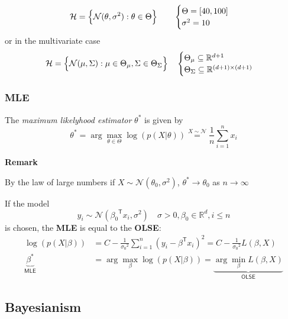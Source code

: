 \newpar{}
\noindent\begin{equation*}
    \mathcal{H}=\Bigl\{\mathcal{N}(\theta, \sigma^2): \theta\in\Theta\Bigr\}\qquad \begin{cases}
        \Theta = [40,100] \\
        \sigma^2 = 10
    \end{cases}
\end{equation*}
or in the multivariate case
\noindent\begin{equation*}
    \mathcal{H}=\Bigl\{\mathcal{N}(\mu, \Sigma): \mu\in\Theta_\mu, \Sigma\in\Theta_\Sigma\Bigr\}\quad \begin{cases}
        \Theta_\mu\subseteq \mathbb{R}^{d+1} \\
        \Theta_\Sigma\subseteq \mathbb{R}^{(d+1)\times (d+1)}
    \end{cases}
\end{equation*}

\subsubsection{MLE}
The \textit{maximum likelyhood estimator} $\theta^*$ is given by
\noindent\begin{equation*}
    \theta^* = \arg\max_{\theta\in\Theta} \log(p(X|\theta)) \overset{X\sim\mathcal{N}}{=} \frac{1}{n} \sum_{i=1}^{n} x_i
\end{equation*}

\textbf{Remark}

By the law of large numbers if $X\sim \mathcal{N}(\theta_0, \sigma^2)$, $\theta^*\to\theta_0$ as $n\to\infty$

\newpar{}

If the model
\noindent\begin{equation*}
    y_i\sim \mathcal{N}({\beta_0}^{\mathsf{T}}x_i, \sigma^2)\quad \sigma>0, \beta_0\in \mathbb{R}^d, i\leq n
\end{equation*}
is chosen, the \textbf{MLE} is equal to the \textbf{OLSE}:
\noindent\begin{align*}
    \log(p(X|\beta))&= C -\frac{1}{{\sigma_0}^2}\sum_{i=1}^{n} {(y_i-\beta^{\mathsf{T}}x_i)}^2 = C-\frac{1}{{\sigma_0}^2}L(\beta,X)      \\
    \underbrace{\beta^*}_{\textsf{MLE}} & = \arg\max_\beta \log(p(X|\beta)) = \underbrace{\arg\min_\beta L(\beta, X)}_{\textsf{OLSE}}
\end{align*}

\subsection{Bayesianism}